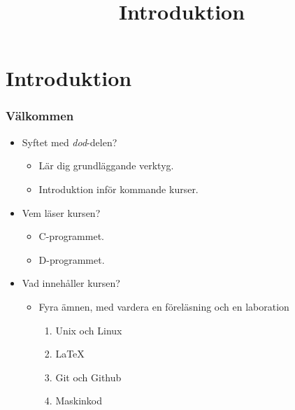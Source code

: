 
\title{Introduktion}
\section{Introduktion}


\begin{frame}[fragile=singleslide]
	\frametitle{Välkommen}
	\begin{itemize}
		\item Syftet med \emph{dod}-delen?
				\begin{itemize}
					\item Lär dig grundläggande verktyg.
					\item Introduktion inför kommande kurser.
				\end{itemize}
		\item Vem läser kursen?
		      \begin{itemize}
				\item C-programmet.
				\item D-programmet. 
		      \end{itemize}
		\item Vad innehåller kursen?
		      \begin{itemize}
			      \item Fyra ämnen, med vardera en föreläsning och en laboration
			      \begin{enumerate}
					\item Unix och Linux
					\item \LaTeX
					\item Git och Github
					\item Maskinkod
				  \end{enumerate}
		      \end{itemize}
	\end{itemize}
\end{frame}



